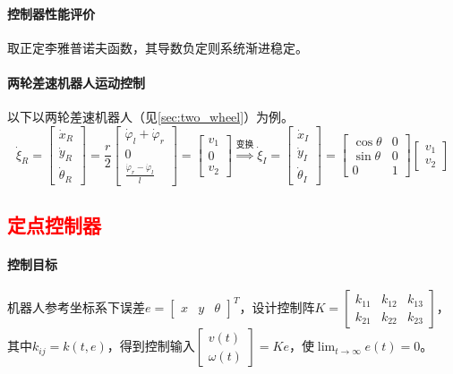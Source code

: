 \documentclass[
12pt, %
a4paper, 
oneside, %
]{scrartcl}
\begin{document}
\paragraph{控制器性能评价}
取正定李雅普诺夫函数，其导数负定则系统渐进稳定。
\paragraph{两轮差速机器人运动控制}
{\footnotesize
以下以两轮差速机器人（见\ref{sec:two_wheel}）为例。
$$ \dot{\xi}_R = \begin{bmatrix} \dot{x}_R \\ \dot{y}_R \\ \dot{\theta}_R \end{bmatrix} = \frac{r}{2} \begin{bmatrix} \dot{\varphi}_l + \dot{\varphi}_r \\ 0 \\ \frac{\dot{\varphi}_r - \dot{\varphi}_l}{l} \end{bmatrix} = \begin{bmatrix} v_1 \\ 0 \\ v_2 \end{bmatrix} \overset{\text{变换}}{\Longrightarrow} \dot{\xi}_I = \begin{bmatrix} \dot{x}_I \\ \dot{y}_I \\ \dot{\theta}_I \end{bmatrix} = \begin{bmatrix} \cos\theta & 0 \\ \sin\theta & 0 \\ 0 & 1 \end{bmatrix} \begin{bmatrix} v_1 \\ v_2 \end{bmatrix} $$
}
\subsection[定点控制器]{\textcolor{red}{定点控制器}}
\paragraph{控制目标}
机器人参考坐标系下误差$ e = \begin{bmatrix} x & y & \theta \end{bmatrix}^T $，设计控制阵$ K = \begin{bmatrix} k_{11} & k_{12} & k_{13} \\ k_{21} & k_{22} & k_{23} \end{bmatrix} $，其中$ k_{ij} = k(t, e) $，得到控制输入$ \begin{bmatrix} v(t) \\ \omega(t) \end{bmatrix} = Ke $，使$ \lim_{t \to \infty} e(t) = 0 $。
\end{document}
